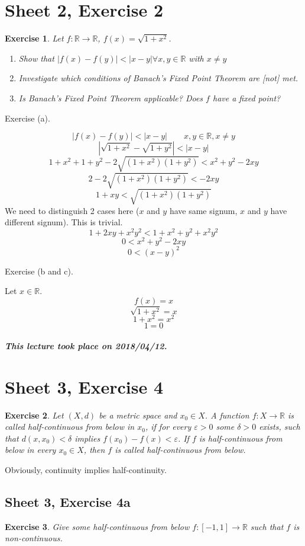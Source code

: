 \documentclass{article}
\newtheorem{ex}{Exercise} %
\newcommand{\card}[1]{\left|#1\right|}
\newcommand{\dateref}[1]{\paragraph{\textit{This lecture took place on #1.}}}
\begin{document}
\section{Sheet 2, Exercise 2}

\begin{ex}
  Let $f: \mathbb R \to \mathbb R$, $f(x) = \sqrt{1 + x^2}$.
  \begin{enumerate}
    \item Show that $\card{f(x) - f(y)} < \card{x - y} \forall x, y \in \mathbb R$ with $x \neq y$
    \item Investigate which conditions of Banach's Fixed Point Theorem are [not] met.
    \item Is Banach's Fixed Point Theorem applicable? Does $f$ have a fixed point?
  \end{enumerate}
\end{ex}

Exercise (a).

\[ \card{f(x) - f(y)} < \card{x - y} \qquad x,y \in \mathbb R, x \neq y \]
\[ \card{\sqrt{1 + x^2} - \sqrt{1 + y^2}} < \card{x - y} \]
\[ 1 + x^2 + 1 + y^2 - 2 \sqrt{(1 + x^2) (1 + y^2)} < x^2 + y^2 - 2xy \]
\[ 2 - 2\sqrt{(1 + x^2)(1 + y^2)} < -2xy \]
\[ 1 + xy < \sqrt{(1 + x^2)(1 + y^2)} \]
We need to distinguish 2 cases here ($x$ and $y$ have same signum, $x$ and $y$ have different signum). This is trivial.
\[ 1 + 2xy + x^2 y^2 < 1 + x^2 + y^2 + x^2 y^2 \]
\[ 0 < x^2 + y^2 - 2xy \]
\[ 0 < (x - y)^2 \]

Exercise (b and c).

Let $x \in \mathbb R$.
\[ f(x) = x \]
\[ \sqrt{1 + x^2} = x \]
\[ 1 + x^2 = x^2 \]
\[ 1 = 0 \]

\dateref{2018/04/12}

\section{Sheet 3, Exercise 4}
\begin{ex}
  Let $(X, d)$ be a metric space and $x_0 \in X$. A function $f: X \to \mathbb R$ is called half-continuous from below in $x_0$, if for every $\varepsilon > 0$ some $\delta > 0$ exists, such that $d(x, x_0) < \delta$ implies $f(x_0) - f(x) < \varepsilon$. If $f$ is half-continuous from below in every $x_0 \in X$, then $f$ is called half-continuous from below.
\end{ex}

Obviously, continuity implies half-continuity.

\subsection{Sheet 3, Exercise 4a}
\begin{ex}
  Give some half-continuous from below $f: [-1, 1] \to \mathbb R$ such that $f$ is non-continuous.
\end{ex}
\end{document}
